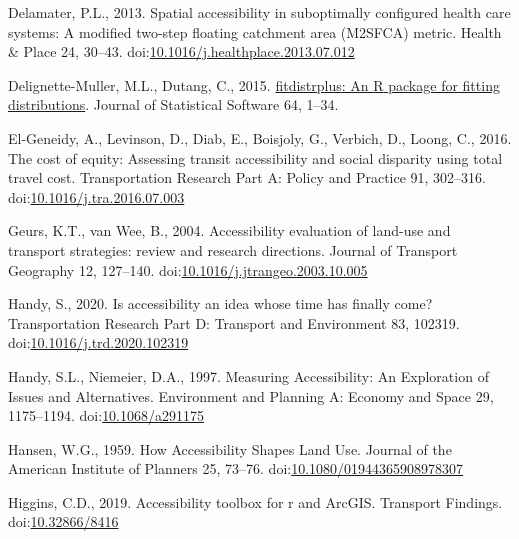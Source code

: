 \documentclass[]{elsarticle} %
\newlength{\cslhangindent}
\newlength{\cslentryspacingunit} %
\newenvironment{CSLReferences}[2] %
 {%
  \setlength{\parindent}{0pt}
  \ifodd #1
  \let\oldpar\par
  \def\par{\hangindent=\cslhangindent\oldpar}
  \fi
  \setlength{\parskip}{#2\cslentryspacingunit}
 }%
 {}
\begin{document}
\begin{CSLReferences}{1}{0}
\leavevmode{}%
Delamater, P.L., 2013. Spatial accessibility in suboptimally configured
health care systems: A modified two-step floating catchment area
(M2SFCA) metric. Health \& Place 24, 30--43.
doi:\href{https://doi.org/10.1016/j.healthplace.2013.07.012}{10.1016/j.healthplace.2013.07.012}

\leavevmode{}%
Delignette-Muller, M.L., Dutang, C., 2015.
\href{https://www.jstatsoft.org/article/view/v064i04}{{fitdistrplus}: An
{R} package for fitting distributions}. Journal of Statistical Software
64, 1--34.

\leavevmode{}%
El-Geneidy, A., Levinson, D., Diab, E., Boisjoly, G., Verbich, D.,
Loong, C., 2016. The cost of equity: {Assessing} transit accessibility
and social disparity using total travel cost. Transportation Research
Part A: Policy and Practice 91, 302--316.
doi:\href{https://doi.org/10.1016/j.tra.2016.07.003}{10.1016/j.tra.2016.07.003}

\leavevmode{}%
Geurs, K.T., van Wee, B., 2004. Accessibility evaluation of land-use and
transport strategies: review and research directions. Journal of
Transport Geography 12, 127--140.
doi:\href{https://doi.org/10.1016/j.jtrangeo.2003.10.005}{10.1016/j.jtrangeo.2003.10.005}

\leavevmode{}%
Handy, S., 2020. Is accessibility an idea whose time has finally come?
Transportation Research Part D: Transport and Environment 83, 102319.
doi:\href{https://doi.org/10.1016/j.trd.2020.102319}{10.1016/j.trd.2020.102319}

\leavevmode{}%
Handy, S.L., Niemeier, D.A., 1997. Measuring {Accessibility}: {An}
{Exploration} of {Issues} and {Alternatives}. Environment and Planning
A: Economy and Space 29, 1175--1194.
doi:\href{https://doi.org/10.1068/a291175}{10.1068/a291175}

\leavevmode{}%
Hansen, W.G., 1959. How Accessibility Shapes Land Use. Journal of the
American Institute of Planners 25, 73--76.
doi:\href{https://doi.org/10.1080/01944365908978307}{10.1080/01944365908978307}

\leavevmode{}%
Higgins, C.D., 2019. Accessibility toolbox for r and ArcGIS. Transport
Findings. doi:\href{https://doi.org/10.32866/8416}{10.32866/8416}


\end{CSLReferences}
\end{document}
